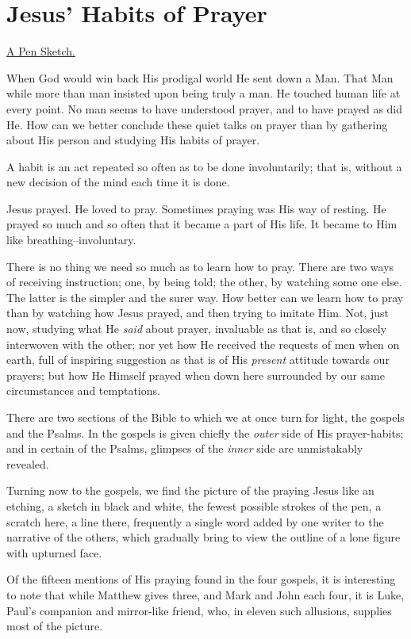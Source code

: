 \chapter{Jesus' Habits of Prayer}



\underline{A Pen Sketch.}


When God would win back His prodigal world He sent down a Man. That Man
while more than man insisted upon being truly a man. He touched human life
at every point. No man seems to have understood prayer, and to have prayed
as did He. How can we better conclude these quiet talks on prayer than by
gathering about His person and studying His habits of prayer.

A habit is an act repeated so often as to be done involuntarily; that is,
without a new decision of the mind each time it is done.

Jesus prayed. He loved to pray. Sometimes praying was His way of resting.
He prayed so much and so often that it became a part of His life. It
became to Him like breathing--involuntary.

There is no thing we need so much as to learn how to pray. There are two
ways of receiving instruction; one, by being told; the other, by watching
some one else. The latter is the simpler and the surer way. How better can
we learn how to pray than by watching how Jesus prayed, and then trying
to imitate Him. Not, just now, studying what He \textit{said} about prayer,
invaluable as that is, and so closely interwoven with the other; nor yet
how He received the requests of men when on earth, full of inspiring
suggestion as that is of His \textit{present} attitude towards our prayers; but
how He Himself prayed when down here surrounded by our same circumstances
and temptations.

There are two sections of the Bible to which we at once turn for light,
the gospels and the Psalms. In the gospels is given chiefly the \textit{outer}
side of His prayer-habits; and in certain of the Psalms, glimpses of the
\textit{inner} side are unmistakably revealed.

Turning now to the gospels, we find the picture of the praying Jesus like
an etching, a sketch in black and white, the fewest possible strokes of
the pen, a scratch here, a line there, frequently a single word added by
one writer to the narrative of the others, which gradually bring to view
the outline of a lone figure with upturned face.

Of the fifteen mentions of His praying found in the four gospels, it is
interesting to note that while Matthew gives three, and Mark and John each
four, it is Luke, Paul's companion and mirror-like friend, who, in eleven
such allusions, supplies most of the picture.


